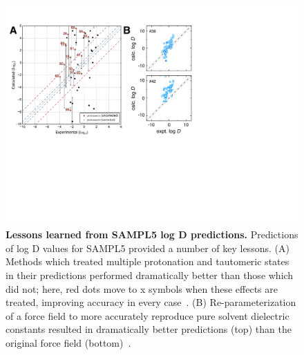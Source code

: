 \documentclass[11pt]{article}
\begin{document}
\begin{figure}
\begin{centering}
\includegraphics[width=\textwidth]{figures/sampl5_logD_v1.pdf}

\end{centering}
\footnotesize
\caption{\label{figure:sampl5_logD}  
\textbf{Lessons learned from SAMPL5 log D predictions.} 
Predictions of log D values for SAMPL5 provided a number of key lessons. (A) Methods which treated multiple protonation and tautomeric states in their predictions performed dramatically better than those which did not; here, red dots move to x symbols when these effects are treated, improving accuracy in every case~\cite{Pickard:2016:JComputAidedMolDes}. (B) Re-parameterization of a force field to more accurately reproduce pure solvent dielectric constants resulted in dramatically better predictions (top) than the original force field (bottom)~\cite{paranahewage_predicting_2016}. 
}
\end{figure}
\end{document}
